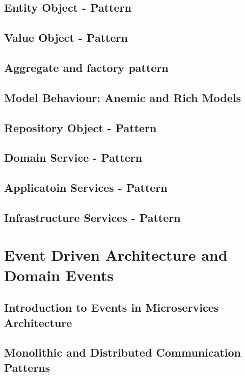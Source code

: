 \documentclass[a4paper, 11pt]{book}
\begin{document}
    \section{Entity Object - Pattern}


    \section{Value Object - Pattern}


    \section{Aggregate and factory pattern}


    \section{Model Behaviour: Anemic and Rich Models}


    \section{Repository Object - Pattern}


    \section{Domain Service - Pattern}


    \section{Applicatoin Services - Pattern}


    \section{Infrastructure Services - Pattern}


    \chapter{Event Driven Architecture and Domain Events}


    \section{Introduction to Events in Microservices Architecture}


    \section{Monolithic and Distributed Communication Patterns}
\end{document}
